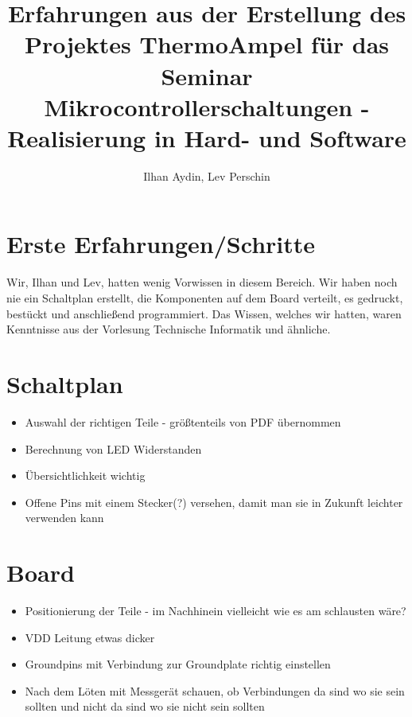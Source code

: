 \documentclass[]{article}
\title{Erfahrungen aus der Erstellung des Projektes \glqq ThermoAmpel\grqq{} für das Seminar \glqq Mikrocontrollerschaltungen - Realisierung in Hard- und Software\grqq}
\author{Ilhan Aydin, Lev Perschin}
\begin{document}
\maketitle
\newpage
\begin{abstract}

\end{abstract}
\newpage
\section{Erste Erfahrungen/Schritte}
Wir, Ilhan und Lev, hatten wenig Vorwissen in diesem Bereich. Wir haben noch nie ein Schaltplan erstellt, die Komponenten auf dem Board verteilt, es gedruckt, bestückt und anschließend programmiert. Das Wissen, welches wir hatten, waren Kenntnisse aus der Vorlesung \glqq Technische Informatik\grqq{} und ähnliche.


\section{Schaltplan}
\begin{itemize}
	\item Auswahl der richtigen Teile - größtenteils von PDF übernommen
	\item Berechnung von LED Widerstanden
	\item Übersichtlichkeit wichtig
	\item Offene Pins mit einem Stecker(?) versehen, damit man sie in Zukunft leichter verwenden kann
\end{itemize}
\section{Board}
\begin{itemize}
	\item Positionierung der Teile - im Nachhinein vielleicht wie es am schlausten wäre?
	\item VDD Leitung etwas dicker
	\item Groundpins mit Verbindung zur Groundplate richtig einstellen
	\item Nach dem Löten mit Messgerät schauen, ob Verbindungen da sind wo sie sein sollten und nicht da sind wo sie nicht sein sollten
\end{itemize}
\end{document}
